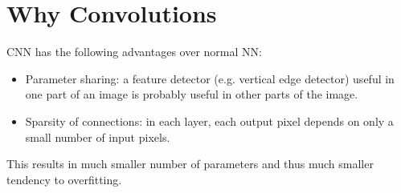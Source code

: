 \section{Why Convolutions}
CNN has the following advantages over normal NN:
\begin{itemize}
  \item Parameter sharing: a feature detector (e.g. vertical edge detector) useful in one part of an image is probably useful in other parts of the image.
  \item Sparsity of connections: in each layer, each output pixel depends on only a small number of input pixels.
\end{itemize}
This results in much smaller number of parameters and thus much smaller tendency to overfitting.
\ifx\PREAMBLE\undefined

\fi